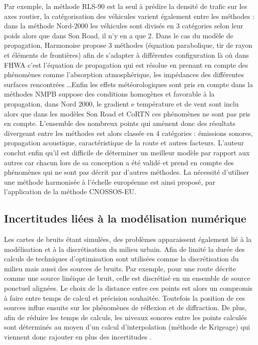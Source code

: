 Par exemple, la méthode RLS-90 est la seul à prédire la densité de trafic sur les axes routier, la catégorisation des véhicules varient également entre les méthodes : dans la méthode Nord-2000 les véhicules sont divisés en 3 catégories selon leur poids alors que dans Son Road, il n'y en a que 2. Dans le cas du modèle de propagation, Harmonoise propose 3 méthodes (équation parabolique, tir de rayon et éléments de frontières) afin de s'adapter à différentes configuration là où dans FHWA c'est l'équation de propagation qui est résolue en prenant en compte des phénomènes comme l'absorption atmosphérique, les impédances des différentes surfaces rencontrées \dots Enfin les effets météorologiques sont pris en compte dans la méthodes NMPB suppose des conditions homogènes et favorable à la propagation, dans Nord 2000, le gradient e température et de vent sont inclu alors que dans les modèles Son Road et CoRTN ces phénomènes ne sont pas pris en compte. L'ensemble des nombreux points qui amènent donc des résultats divergeant entre les méthodes est alors classée en 4 catégories : émissions sonores, propagation acoustique, caractéristique de la route et autres facteurs. L'auteur conclut enfin qu'il est difficile de déterminer un \og meilleur \fg{} modèle par rapport aux autres car chacun lors de sa conception a été validé et prend en compte des phénomènes qui ne sont pas décrit par d'autres méthodes. La nécessité d'utiliser une méthode harmonisée à l'échelle européenne est ainsi proposé, par l'application de la méthode CNOSSOS-EU. 

\subsection{Incertitudes liées à la modélisation numérique}

Les cartes de bruits étant simulées, des problèmes apparaissent également lié à la modélisation et à la discrétisation du milieu urbain. Afin de limité la durée des calculs de techniques d'optimisation sont utilisées comme la discrétisation du milieu mais aussi des sources de bruits. Par exemple, pour une route décrite comme une source linéique de bruit, celle est discrétisé en un ensemble de source ponctuel alignées. Le choix de la distance entre ces points est alors un compromis à faire entre temps de calcul et précision souhaitée. Toutefois la position de ces sources influe ensuite sur les phénomènes de réflexion et de diffraction. De plus, afin de réduire les temps de calculs, les niveaux sonores entre les points calculés sont déterminés au moyen d'un calcul d'interpolation (méthode de Krigeage) qui viennent donc rajouter en plus des incertitudes \cite{van_leeuwen_noise_2015}. 

